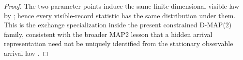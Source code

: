 \begin{proof}
The two parameter points induce the same finite-dimensional visible law by
; hence every visible-record
statistic has the same distribution under them.  This is the exchange
specialization inside the present constrained D-MAP(2) family, consistent with the
broader MAP2 lesson that a hidden arrival representation need not be uniquely
identified from the stationary observable arrival law
\cite{RamirezCoboLilloWiper2010MAP2Nonidentifiability}.
\end{proof}
